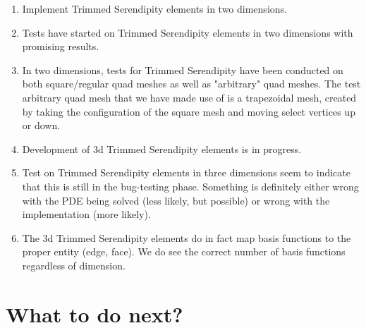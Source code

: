 \documentclass[12pt]{extarticle}
\newcommand{\<}{\langle}
\renewcommand{\>}{\rangle}
\theoremstyle{definition}
\begin{document}
\begin{enumerate}
    \item Implement Trimmed Serendipity elements in two dimensions.
    \item Tests have started on Trimmed Serendipity elements in two dimensions with promising results.
    \item In two dimensions, tests for Trimmed Serendipity have been conducted on both square/regular quad meshes as well as "arbitrary" quad meshes.  The test arbitrary quad mesh that we have made use of is a trapezoidal mesh, created by taking the configuration of the square mesh and moving select vertices up or down.
    \item Development of 3d Trimmed Serendipity elements is in progress.  
    \item Test on Trimmed Serendipity elements in three dimensions seem to indicate that this is still in the bug-testing phase.  Something is definitely either wrong with the PDE being solved (less likely, but possible) or wrong with the implementation (more likely).
    \item The 3d Trimmed Serendipity elements do in fact map basis functions to the proper entity (edge, face).  We do see the correct number of basis functions regardless of dimension.
\end{enumerate}

\section{What to do next?}
\end{document}
